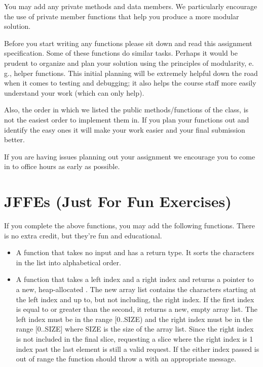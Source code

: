 \documentclass[11pt]{report}
\begin{document}
    You may add any private methods and data members.  We particularly
    encourage the use of private member functions that help you produce
    a more modular solution.
    
    Before you start writing any functions please sit down and read this
    assignment specification.  Some of these functions do similar tasks.
    Perhaps it would be prudent to organize and plan your solution using
    the principles of modularity, e. g., helper functions.  This initial
    planning will be extremely helpful down the road when it comes to
    testing and debugging; it also helps the course staff more easily
    understand your work (which can only help).
    
    Also, the order in which we listed the public methods/functions of
    the  class, is not the easiest order to implement them
    in.  If you plan your functions out and identify the easy ones it
    will make your work easier and your final submission better.
    
    If you are having issues planning out your assignment we encourage
    you to come in to office hours as early as possible.
    
\section*{JFFEs (Just For Fun Exercises)}
If you complete the above functions, you may add the following functions. There is no extra credit, but they're fun and educational.

\begin{itemize}
    \item A  function that takes no input and has a  return type.
      It sorts the characters in the list into alphabetical order.
    \item A  function that takes a left index and a right index and
      returns a pointer to a new, heap-allocated .  The
      new array list contains the characters starting at the left
      index and up to, but not including, the right index.  If the
      first index is equal to or greater than the second, it returns a
      new, empty array list.  The left index must be in the range
      [0..SIZE) and the right index must be in the range [0..SIZE]
      where SIZE is the size of the array list. Since the right index
      is not included in the final slice, requesting a slice where the
      right index is 1 index past the last element is still a valid
      request.  If the either index passed is out of range the
      function should throw a  with an appropriate
      message.
\end{itemize}
\end{document}
